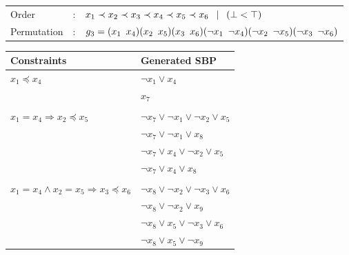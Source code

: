 


\begin{center}
	\begin{tabular}{lll}
		Order &:& $ x_1 \prec x_2 \prec x_3 \prec x_4 \prec x_5 \prec x_6 \enskip \mid \enskip  (\bot < \top)$ \\
		Permutation &:& $g_3 = (x_1 \enskip x_4)(x_2 \enskip x_5)(x_3 \enskip x_6)(\neg x_1 \enskip \neg x_4)(\neg x_2 \enskip \neg x_5)(\neg x_3 \enskip \neg x_6)$
	\end{tabular}
	
	\vspace*{2\baselineskip}
	
	\begin{tabular}{ll}
		Constraints & Generated SBP\\
		\midrule
		$x_1 \preceq x_4$ & $ \neg x_1 \lor x_4$ \\
		& $x_7$ \\
		&\\
		$x_1 = x_4 \Rightarrow x_2 \preceq x_5$ &  $ \neg x_7 \lor \neg x_1 \lor \neg x_2 \lor x_5$\\
		& $ \neg x_7 \lor \neg x_1 \lor x_8$\\
		& $ \neg x_7 \lor  x_4 \lor \neg x_2 \lor x_5$ \\
		& $ \neg x_7 \lor x_4 \lor x_8$\\
		
		&\\
		$x_1 = x_4 \land x_2 = x_5 \Rightarrow x_3 \preceq x_6$ 
		& $\neg x_8 \lor \neg x_2 \lor \neg x_3 \lor x_6$\\
		& $\neg x_8 \lor \neg x_2 \lor x_9$\\
		& $\neg x_8 \lor x_5 \lor \neg x_3 \lor x_6$\\
		& $\neg x_8 \lor x_5 \lor \neg x_9$\\

	\end{tabular}
\end{center}